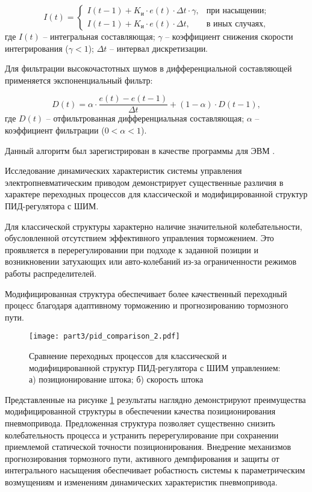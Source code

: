 \begin{equation}\label{eq:anti_windup}
	I(t) = \begin{cases}
		I(t-1) + K_{\text{и}} \cdot e(t) \cdot \Delta t \cdot \gamma, & \text{при насыщении};  \\
		I(t-1) + K_{\text{и}} \cdot e(t) \cdot \Delta t,              & \text{в иных случаях},
	\end{cases}
\end{equation}
где $I(t)$ -- интегральная составляющая;
$\gamma$ -- коэффициент снижения скорости интегрирования ($\gamma < 1$);
$\Delta t$ -- интервал дискретизации.

Для фильтрации высокочастотных шумов в дифференциальной составляющей применяется экспоненциальный фильтр:

\begin{equation}\label{eq:derivative_filter}
	D(t) = \alpha \cdot \frac{e(t) - e(t-1)}{\Delta t} + (1-\alpha) \cdot D(t-1),
\end{equation}
где $D(t)$ -- отфильтрованная дифференциальная составляющая;
$\alpha$ -- коэффициент фильтрации ($0 < \alpha < 1$).

Данный алгоритм был зарегистрирован в качестве программы для ЭВМ \cite{progbib1}.

Исследование динамических характеристик системы управления электропневматическим приводом демонстрирует существенные различия в характере
переходных процессов для классической и модифицированной структур ПИД-регулятора с ШИМ.

Для классической структуры характерно наличие значительной колебательности, обусловленной отсутствием эффективного
управления торможением. Это проявляется в перерегулировании при подходе к заданной позиции и возникновении затухающих или авто-колебаний
из-за ограниченности режимов работы распределителей.

Модифицированная структура обеспечивает более качественный переходный процесс благодаря адаптивному торможению и
прогнозированию тормозного пути.

\begin{figure}
	\centering
	\texttt{[image: part3/pid\_comparison\_2.pdf]}
	\caption{Сравнение переходных процессов для классической и модифицированной структур ПИД-регулятора с ШИМ управлением:\\
		а) позиционирование штока; б) скорость штока}
	\label{fig:ch3:transient_comparison}
\end{figure}

Представленные на рисунке \ref{fig:ch3:transient_comparison} результаты наглядно демонстрируют преимущества
модифицированной структуры в обеспечении качества позиционирования пневмопривода. Предложенная структура
позволяет существенно снизить колебательность процесса и устранить перерегулирование при сохранении приемлемой статической точности позиционирования.
Внедрение механизмов прогнозирования тормозного пути, активного демпфирования и защиты от интегрального насыщения обеспечивает
робастность системы к параметрическим возмущениям и изменениям динамических характеристик пневмопривода.